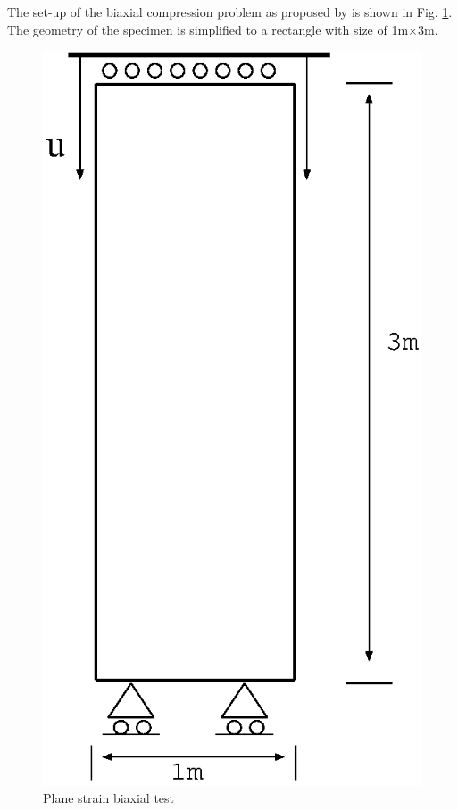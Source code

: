 The set-up of the biaxial compression problem as proposed by
\cite{Bo00} is shown in Fig. \ref{fig:biaxial}. The geometry of the
specimen is simplified to a rectangle with size of 1m$\times$3m.
\begin{figure}[!htb]
\center
\includegraphics[scale=0.45]{M/biaxial.eps}
\caption{Plane strain biaxial test}
 \label{fig:biaxial}
\end{figure}

